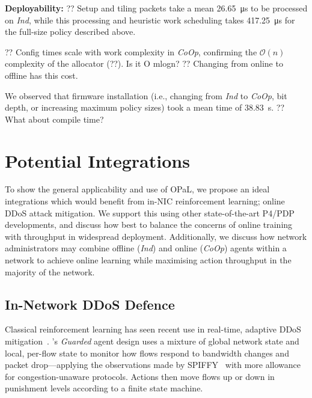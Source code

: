 \documentclass[sigconf,natbib=false]{acmart}
\newcommand{\fakepara}[1]{\noindent\textbf{#1:}}
\newcommand{\approachshort}{OPaL}
\newcommand{\Coopfw}{\emph{CoOp}}
\newcommand{\Indfw}{\emph{Ind}}
\begin{document}
%

\fakepara{Deployability}
?? Setup and tiling packets take a mean \SI{26.65}{\micro\second} to be processed on \Indfw{}, while this processing and heuristic work scheduling takes \SI{417.25}{\micro\second} for the full-size policy described above.

?? Config times scale with work complexity in \Coopfw{}, confirming the $\mathcal{O}{\left(n\right)}$ complexity of the allocator (??). Is it O mlogn?
?? Changing from online to offline has this cost.

We observed that firmware installation (i.e., changing from \Indfw{} to \Coopfw{}, bit depth, or increasing maximum policy sizes) took a mean time of \SI{38.83}{\second}.
?? What about compile time?

\section{Potential Integrations}\label{sec:potential-integrations}
To show the general applicability and use of \approachshort{}, we propose an ideal integrations which would benefit from in-NIC reinforcement learning; online DDoS attack mitigation.
We support this using other state-of-the-art P4/PDP developments, and discuss how best to balance the concerns of online training with throughput in widespread deployment.
Additionally, we discuss how network administrators may combine offline (\Indfw) and online (\Coopfw) agents within a network to achieve online learning while maximising action throughput in the majority of the network.

\subsection{In-Network DDoS Defence}\label{sec:integ-1}
Classical reinforcement learning has seen recent use in real-time, adaptive DDoS mitigation~\parencite{DBLP:journals/tnsm/SimpsonRP20}.
's \emph{Guarded} agent design uses a mixture of global network state and local, per-flow state to monitor how flows respond to bandwidth changes and packet drop---applying the observations made by SPIFFY~\parencite{DBLP:conf/ndss/KangGS16} with more allowance for congestion-unaware protocols.
Actions then move flows up or down in punishment levels according to a finite state machine.
\end{document}
